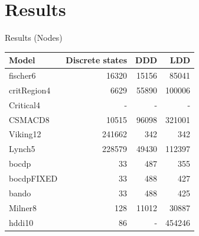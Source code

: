 \section{Results}

\begin{frame}{Results (Nodes)}

\begin{table}
    \begin{tabular}{|l|r|r|r|}
    \hline
     Model      & Discrete states & DDD     & LDD         \\ \hline
    fischer6    & 16320           & 15156   & 85041       \\
    critRegion4 & 6629            & 55890   & 100006      \\
    Critical4   & -               & -       & -           \\
    CSMACD8     & 10515           & 96098   & 321001      \\
    Viking12    & 241662          & 342     & 342         \\
    Lynch5      & 228579          & 49430   & 112397      \\
    bocdp       & 33              & 487     & 355         \\
    bocdpFIXED  & 33              & 488     & 427         \\
    bando       & 33              & 488     & 425         \\
    Milner8     & 128             & 11012   & 30887       \\
    hddi10      & 86              & -       & 454246      \\ \hline
    \end{tabular}
\end{table}

\end{frame}

